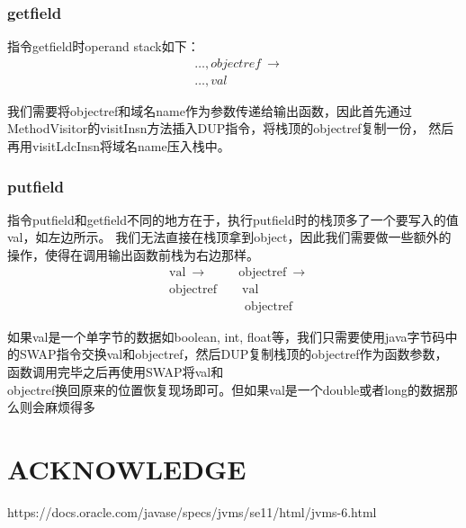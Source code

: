 \documentclass[UTF8]{article}
\begin{document}
\subsubsection{getfield}
指令getfield时operand stack如下：
\begin{equation*}
    \begin{split}
        &\ldots, objectref\ \rightarrow\\
        &\ldots, val
    \end{split}
\end{equation*}

我们需要将objectref和域名name作为参数传递给输出函数，因此首先通过MethodVisitor的visitInsn方法插入DUP指令，将栈顶的objectref复制一份，
然后再用visitLdcInsn将域名name压入栈中。

\subsubsection{putfield}
指令putfield和getfield不同的地方在于，执行putfield时的栈顶多了一个要写入的值val，如左边所示。
我们无法直接在栈顶拿到object，因此我们需要做一些额外的操作，使得在调用输出函数前栈为右边那样。
\begin{equation*}
    \begin{split}
        &\text{val}\ \rightarrow\qquad\ \  \text{objectref}\ \rightarrow\\
        &\text{objectref}\qquad \text{val}\\
        &\qquad\qquad\qquad\text{objectref}
    \end{split}
\end{equation*}

如果val是一个单字节的数据如boolean, int, float等，我们只需要使用java字节码中的SWAP指令交换val和objectref，然后DUP复制栈顶的objectref作为函数参数，
函数调用完毕之后再使用SWAP将val和\\objectref换回原来的位置恢复现场即可。但如果val是一个double或者long的数据那么则会麻烦得多



\section{ACKNOWLEDGE}
https://docs.oracle.com/javase/specs/jvms/se11/html/jvms-6.html
\end{document}
